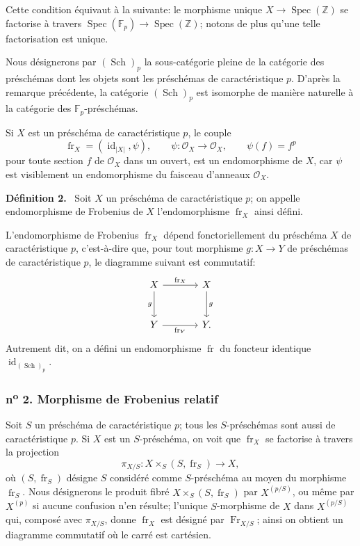 \documentclass[11pt]{article}
\newenvironment{statement}[1]{\par\medskip\noindent\textbf{#1.}\ }{\par\medskip}
\DeclareMathOperator{\Spec}{Spec}
\providecommand{\OO}{\mathcal{O}}
\providecommand{\id}{\operatorname{id}}
\providecommand{\id}{\operatorname{id}}
\providecommand{\id}{\operatorname{id}}
\providecommand{\id}{\operatorname{id}}
\providecommand{\Spec}{\operatorname{Spec}}
\providecommand{\Spec}{\operatorname{Spec}}
\providecommand{\id}{\operatorname{id}}
\providecommand{\Spec}{\operatorname{Spec}}
\providecommand{\fr}{\operatorname{fr}}
\providecommand{\Fr}{\operatorname{Fr}}
\providecommand{\Sch}{\operatorname{Sch}}
\providecommand{\bF}{\mathbb F}
\providecommand{\bbZ}{\mathbb Z}
\begin{document}
Cette condition équivaut à la suivante: le morphisme unique $X\to\Spec(\bbZ)$ se factorise à travers $\Spec(\bF_p)\to\Spec(\bbZ)$; notons de plus qu'une telle factorisation est unique.

Nous désignerons par $(\Sch)_p$ la sous-catégorie pleine de la catégorie des préschémas dont les objets sont les préschémas de caractéristique $p$. D'après la remarque précédente, la catégorie $(\Sch)_p$ est isomorphe de manière naturelle à la catégorie des $\bF_p$-préschémas.

Si $X$ est un préschéma de caractéristique $p$, le couple
\[
\fr_X=(\id_{|X|},\psi),
\qquad \psi:\OO_X\longrightarrow\OO_X,
\qquad \psi(f)=f^p
\]
pour toute section $f$ de $\OO_X$ dans un ouvert, est un endomorphisme de $X$, car $\psi$ est visiblement un endomorphisme du faisceau d'anneaux $\OO_X$.

\begin{statement}{Définition 2}
Soit $X$ un préschéma de caractéristique $p$; on appelle endomorphisme de Frobenius de $X$ l'endomorphisme $\fr_X$ ainsi défini.
\end{statement}

L'endomorphisme de Frobenius $\fr_X$ dépend fonctoriellement du préschéma $X$ de caractéristique $p$, c'est-à-dire que, pour tout morphisme $g:X\to Y$ de préschémas de caractéristique $p$, le diagramme suivant est commutatif:
\[
\begin{tikzcd}[column sep=large,row sep=large]
X \arrow[r,"\fr_X"] \arrow[d,"g"'] & X \arrow[d,"g"]\\
Y \arrow[r,"\fr_Y"'] & Y.
\end{tikzcd}
\]
Autrement dit, on a défini un endomorphisme $\fr$ du foncteur identique $\id_{(\Sch)_p}$.

\subsubsection*{n\textsuperscript{o} 2. Morphisme de Frobenius relatif}

Soit $S$ un préschéma de caractéristique $p$; tous les $S$-préschémas sont aussi de caractéristique $p$. Si $X$ est un $S$-préschéma, on voit que $\fr_X$ se factorise à travers la projection
\[
\pi_{X/S}:X\times_S(S,\fr_S)\longrightarrow X,
\]
où $(S,\fr_S)$ désigne $S$ considéré comme $S$-préschéma au moyen du morphisme $\fr_S$. Nous désignerons le produit fibré $X\times_S(S,\fr_S)$ par $X^{(p/S)}$, ou même par $X^{(p)}$ si aucune confusion n'en résulte; l'unique $S$-morphisme de $X$ dans $X^{(p/S)}$ qui, composé avec $\pi_{X/S}$, donne $\fr_X$ est désigné par $\Fr_{X/S}$; ainsi on obtient un diagramme commutatif où le carré est cartésien.
\end{document}
